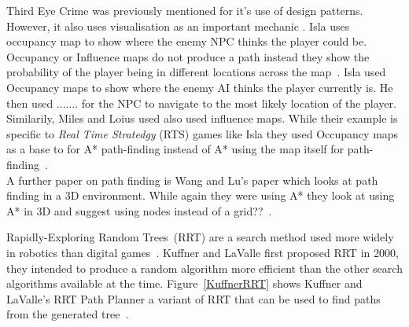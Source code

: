 \documentclass[journal]{IEEEtran}
\begin{document}
Third Eye Crime was previously mentioned for it's use of design patterns. However, it also uses visualisation as an important mechanic \cite{Isla2014}. Isla uses occupancy map to show where the enemy NPC thinks the player could be. Occupancy or Influence maps do not produce a path instead they show the probability of the player being in different locations across the map~\cite{Isla2014, Miles2006}. Isla used Occupancy maps to show where the enemy AI thinks the player currently is. He then used ....... for the NPC to navigate to the most likely location of the player. Similarily, Miles and Loius used also used influence maps. While their example is specific to \textit{Real Time Stratedgy} (RTS) games like Isla they used Occupancy maps as a base to for A* path-finding instead of A* using the map itself for path-finding~\cite{Miles2006}.\\
 
A further paper on path finding is Wang and Lu's paper which looks at path finding in a 3D environment. While again they were using A* they look at using A* in 3D and suggest using nodes instead of a grid??~\cite{wang2012}.

Rapidly-Exploring Random Trees~(RRT) are a search method used more widely in robotics than digital games~\cite{Kuffner2000}. Kuffner and LaValle first proposed RRT in 2000, they intended to produce a random algorithm more efficient than the other search algorithms available at the time. Figure~\ref{KuffnerRRT} shows  Kuffner and LaValle's RRT Path Planner a variant of RRT that can be used to find paths from the generated tree~\cite{Kuffner2000}.
\end{document}
